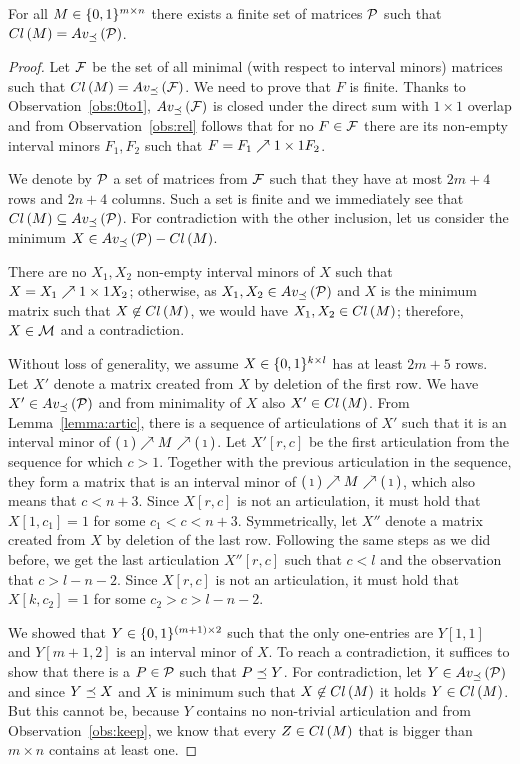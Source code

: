 \begin{thm}
For all $M\in\{0,1\}^{m\times n}$ there exists a finite set of matrices $\mathcal{P}$ such that $Cl\left(M\right)=Av_{\preceq}\left(\mathcal{P}\right)$.
\end{thm}
\begin{proof}
Let $\mathcal{F}$ be the set of all minimal (with respect to interval minors) matrices such that $Cl\left(M\right)=Av_{\preceq}\left(\mathcal{F}\right)$. We need to prove that $F$ is finite. Thanks to Observation~\ref{obs:0to1}, $Av_{\preceq}\left(\mathcal{F}\right)$ is closed under the direct sum with $1\times1$ overlap and from Observation~\ref{obs:rel} follows that for no $F\in\mathcal{F}$ there are its non-empty interval minors $F_1,F_2$ such that $F=F_1\nearrow{1\times1}F_2$.

We denote by $\mathcal{P}$ a set of matrices from $\mathcal{F}$ such that they have at most $2m+4$ rows and $2n+4$ columns. Such a set is finite and we immediately see that $Cl\left(M\right)\subseteq Av_{\preceq}\left(\mathcal{P}\right)$. For contradiction with the other inclusion, let us consider the minimum $X\in Av_{\preceq}\left(\mathcal{P}\right)-Cl\left(M\right)$.

There are no $X_1,X_2$ non-empty interval minors of $X$ such that $X=X_1\nearrow{1\times1}X_2$; otherwise, as $X_1,X_2\in Av_{\preceq}\left(\mathcal{P}\right)$ and $X$ is the minimum matrix such that $X\not\in Cl\left(M\right)$, we would have $X_1,X_2\in Cl\left(M\right)$; therefore, $X\in\mathcal{M}$ and a contradiction.

Without loss of generality, we assume $X\in\{0,1\}^{k\times l}$ has at least $2m+5$ rows. Let $X'$ denote a matrix created from $X$ by deletion of the first row. We have $X'\in Av_{\preceq}\left(\mathcal{P}\right)$ and from minimality of $X$ also $X'\in Cl\left(M\right)$. From Lemma~\ref{lemma:artic}, there is a sequence of articulations of $X'$ such that it is an interval minor of $\left(\begin{smallmatrix}1\end{smallmatrix}\right)\nearrow M\nearrow\left(\begin{smallmatrix}1\end{smallmatrix}\right)$. Let $X'[r,c]$ be the first articulation from the sequence for which $c>1$. Together with the previous articulation in the sequence, they form a matrix that is an interval minor of $\left(\begin{smallmatrix}1\end{smallmatrix}\right)\nearrow M\nearrow\left(\begin{smallmatrix}1\end{smallmatrix}\right)$, which also means that $c<n+3$. Since $X[r,c]$ is not an articulation, it must hold that $X[1,c_1]=1$ for some $c_1<c<n+3$. Symmetrically, let $X''$ denote a matrix created from $X$ by deletion of the last row. Following the same steps as we did before, we get the last articulation $X''[r,c]$ such that $c<l$ and the observation that $c>l-n-2$. Since $X[r,c]$ is not an articulation, it must hold that $X[k,c_2]=1$ for some $c_2>c>l-n-2$.

We showed that $Y\in\{0,1\}^{(m+1)\times2}$ such that the only one-entries are $Y[1,1]$ and $Y[m+1,2]$ is an interval minor of $X$. To reach a contradiction, it suffices to show that there is a $P\in\mathcal{P}$ such that $P\preceq Y$. For contradiction, let $Y\in Av_{\preceq}\left(\mathcal{P}\right)$ and since $Y\preceq X$ and $X$ is minimum such that $X\not\in Cl\left(M\right)$ it holds $Y\in Cl\left(M\right)$. But this cannot be, because $Y$ contains no non-trivial articulation and from Observation~\ref{obs:keep}, we know that every $Z\in Cl\left(M\right)$ that is bigger than $m\times n$ contains at least one.
\end{proof}

